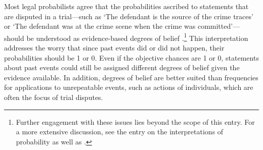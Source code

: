 \documentclass{article}
\begin{document}
Most legal probabilists agree 
that the probabilities ascribed to statements that are disputed in a trial---such as `The defendant is the source of the crime traces' or `The defendant was at the crime scene when the crime was committed'---should be understood as evidence-based degrees of belief \citep[see, for example,][]{Cullison1969Probability, kaye79, nance2016}.\footnote{Further engagement with these issues lies beyond the scope of this entry. For a more extensive discussion, see the entry on the interpretations of probability \citep{sep-probability-interpret} 
as well as \citep{skyrms1968choice,gillies2000philosophical,mellor2004probability,childers2013philosophy}.} 
%
%
This interpretation addresses the worry that since past events  did or did not happen, their probabilities should be 1 or 0. Even if the objective chances are 1 or 0, %
statements about past events could still be assigned  different degrees of belief  given the evidence available. %
In addition, degrees of belief are better suited than frequencies for applications to unrepeatable events, such as actions of individuals, which are often the focus of trial disputes.  
\end{document}
